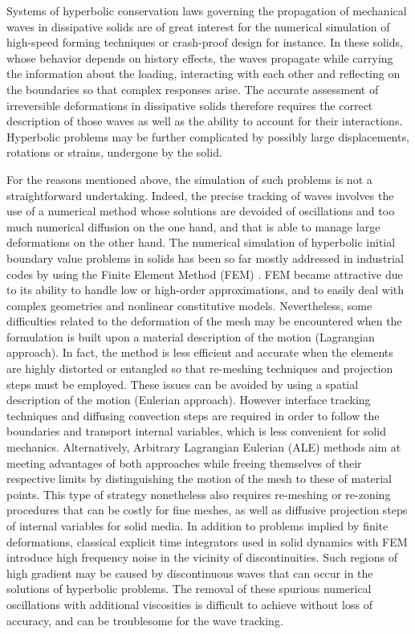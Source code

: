 Systems of hyperbolic conservation laws governing the propagation of mechanical waves in dissipative solids are of great interest for the numerical simulation of high-speed forming techniques or crash-proof design for instance.
In these solids, whose behavior depends on history effects, the waves propagate while carrying the information about the loading, interacting with each other and reflecting on the boundaries so that complex responses arise.
The accurate assessment of irreversible deformations in dissipative solids therefore requires the correct description of those waves as well as the ability to account for their interactions.
Hyperbolic problems may be further complicated by possibly large displacements, rotations or strains, undergone by the solid.

For the reasons mentioned above, the simulation of such problems is not a straightforward undertaking.
Indeed, the precise tracking of waves involves the use of a numerical method whose solutions are devoided of oscillations and too much numerical diffusion on the one hand, and that is able to manage large deformations on the other hand.
The numerical simulation of hyperbolic initial boundary value problems in solids has been so far mostly addressed in industrial codes by using the Finite Element Method (FEM) \cite{Belytschko}.
FEM became attractive due to its ability to handle low or high-order approximations, and to easily deal with complex geometries and nonlinear constitutive models. %
Nevertheless, some difficulties related to the deformation of the mesh may be encountered when the formulation is built upon a material description of the motion (Lagrangian approach). 
In fact, the method is less efficient and accurate when the elements are highly distorted or entangled so that re-meshing techniques and projection steps must be employed.
These issues can be avoided by using a spatial description of the motion (Eulerian approach).
However interface tracking techniques and diffusing convection steps are required in order to follow the boundaries and transport internal variables, which is less convenient for solid mechanics.
Alternatively, Arbitrary Lagrangian Eulerian (ALE) methods aim at meeting advantages of both approaches while freeing themselves of their respective limits by distinguishing the motion of the mesh to these of material points.
This type of strategy nonetheless also requires re-meshing or re-zoning procedures that can be costly for fine meshes, as well as diffusive projection steps of internal variables for solid media.
In addition to problems implied by finite deformations, classical explicit time integrators used in solid dynamics with FEM introduce high frequency noise in the vicinity of discontinuities.
Such regions of high gradient may be caused by discontinuous waves that can occur in the solutions of hyperbolic problems.
The removal of these spurious numerical oscillations with additional viscosities is difficult to achieve without loss of accuracy, and can be troublesome for the wave tracking.

